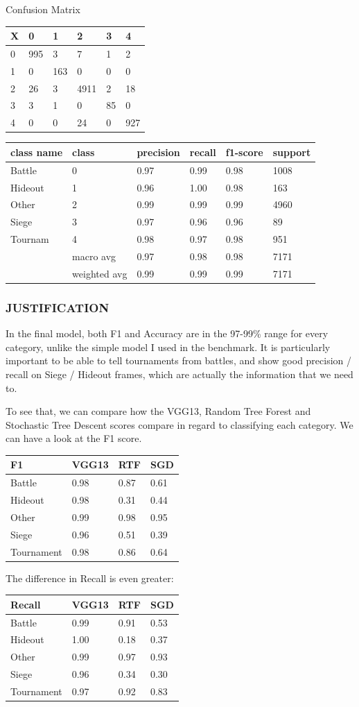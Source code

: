 \documentclass[
]{article}
\begin{document}
Confusion Matrix

\begin{longtable}[]{@{}llllll@{}}
\toprule
X & 0 & 1 & 2 & 3 & 4\tabularnewline
\midrule
\endhead
0 & 995 & 3 & 7 & 1 & 2\tabularnewline
1 & 0 & 163 & 0 & 0 & 0\tabularnewline
2 & 26 & 3 & 4911 & 2 & 18\tabularnewline
3 & 3 & 1 & 0 & 85 & 0\tabularnewline
4 & 0 & 0 & 24 & 0 & 927\tabularnewline
\bottomrule
\end{longtable}

\begin{longtable}[]{@{}llllll@{}}
\toprule
class name & class & precision & recall & f1-score &
support\tabularnewline
\midrule
\endhead
Battle & 0 & 0.97 & 0.99 & 0.98 & 1008\tabularnewline
Hideout & 1 & 0.96 & 1.00 & 0.98 & 163\tabularnewline
Other & 2 & 0.99 & 0.99 & 0.99 & 4960\tabularnewline
Siege & 3 & 0.97 & 0.96 & 0.96 & 89\tabularnewline
Tournam & 4 & 0.98 & 0.97 & 0.98 & 951\tabularnewline
& macro avg & 0.97 & 0.98 & 0.98 & 7171\tabularnewline
& weighted avg & 0.99 & 0.99 & 0.99 & 7171\tabularnewline
\bottomrule
\end{longtable}

\hypertarget{justification}{%
\subsubsection{JUSTIFICATION}\label{justification}}

In the final model, both F1 and Accuracy are in the 97-99\% range for
every category, unlike the simple model I used in the benchmark. It is
particularly important to be able to tell tournaments from battles, and
show good precision / recall on Siege / Hideout frames, which are
actually the information that we need to.

To see that, we can compare how the VGG13, Random Tree Forest and
Stochastic Tree Descent scores compare in regard to classifying each
category. We can have a look at the F1 score.

\begin{longtable}[]{@{}llll@{}}
\toprule
F1 & VGG13 & RTF & SGD\tabularnewline
\midrule
\endhead
Battle & 0.98 & 0.87 & 0.61\tabularnewline
Hideout & 0.98 & 0.31 & 0.44\tabularnewline
Other & 0.99 & 0.98 & 0.95\tabularnewline
Siege & 0.96 & 0.51 & 0.39\tabularnewline
Tournament & 0.98 & 0.86 & 0.64\tabularnewline
\bottomrule
\end{longtable}

The difference in Recall is even greater:

\begin{longtable}[]{@{}llll@{}}
\toprule
Recall & VGG13 & RTF & SGD\tabularnewline
\midrule
\endhead
Battle & 0.99 & 0.91 & 0.53\tabularnewline
Hideout & 1.00 & 0.18 & 0.37\tabularnewline
Other & 0.99 & 0.97 & 0.93\tabularnewline
Siege & 0.96 & 0.34 & 0.30\tabularnewline
Tournament & 0.97 & 0.92 & 0.83\tabularnewline
\bottomrule
\end{longtable}
\end{document}
